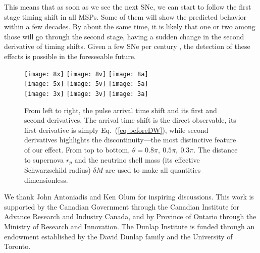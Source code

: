 \documentclass[aps,showpacs,onecolumn,floats,prd,superscriptaddress,nofootinbib]{revtex4}
\begin{document}
This means that as soon as we see the next SNe, we can start to follow the first stage timing shift in all MSPs. Some of them will show the predicted behavior within a few decades. By about the same time, it is likely that one or two among those will go through the second stage, having a sudden change in the second derivative of timing shifts. Given a few SNe per century \cite{SNrate06}, the detection of these effects is possible in the foreseeable future. 


\begin{figure}[t]
\texttt{[image: 8x]}
\texttt{[image: 8v]}
\texttt{[image: 8a]} \\
\texttt{[image: 5x]}
\texttt{[image: 5v]}
\texttt{[image: 5a]} \\
\texttt{[image: 3x]}
\texttt{[image: 3v]}
\texttt{[image: 3a]}
\caption{From left to right, the pulse arrival time shift and its first and second derivatives. The arrival time shift is the direct observable, its first derivative is simply Eq.~(\ref{eq-beforeDW}), while second derivatives highlights the discontinuity---the most distinctive feature of our effect. From top to bottom, $\theta=0.8\pi, \ 0.5\pi, \ 0.3\pi$. The distance to supernova $r_p$ and the neutrino shell mass (its effective Schwarzschild radius) $\delta M$ are used to make all quantities dimensionless.}
\label{fig-3x3}
\end{figure}

\acknowledgments

We thank John Antoniadis and Ken Olum for inspiring discussions. This work is supported by the Canadian Government through the Canadian Institute for Advance Research and Industry Canada, and by Province of Ontario through the Ministry of Research and Innovation. The Dunlap Institute is funded through an endowment established by the David Dunlap family and the University of Toronto.

\appendix

%

\end{document}
